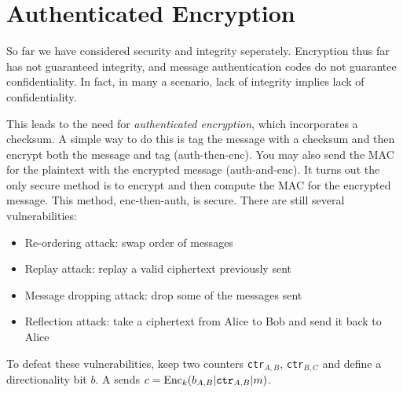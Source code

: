 \section{Authenticated Encryption}

So far we have considered security and 
integrity seperately. Encryption thus 
far has not guaranteed integrity, and 
message authentication codes do not 
guarantee confidentiality. In fact, 
in many a scenario, lack of integrity 
implies lack of confidentiality. 

This leads to the need for 
\emph{authenticated encryption}, 
which incorporates a checksum. 
A simple way to do this is tag 
the message with a checksum and 
then encrypt both the message 
and tag (auth-then-enc). You 
may also send the MAC for the 
plaintext with the encrypted message 
(auth-and-enc). It turns out the 
only secure method is to encrypt 
and then compute the MAC for the 
encrypted message. This method, 
enc-then-auth, is secure. 
There are still several vulnerabilities:
\begin{itemize}
    \item Re-ordering attack: swap order of messages
    \item Replay attack: replay a valid ciphertext previously sent
    \item Message dropping attack: drop some of the messages sent
    \item Reflection attack: take a 
    ciphertext from Alice to Bob and 
    send it back to Alice
\end{itemize}
To defeat these vulnerabilities, keep two counters 
\texttt{ctr}$_{A,B}$, \texttt{ctr}$_{B,C}$ and 
define a directionality bit $b$. A sends 
$c = \text{Enc}_k(b_{A,B}|\text{\texttt{ctr}}_{A,B}|m)$.